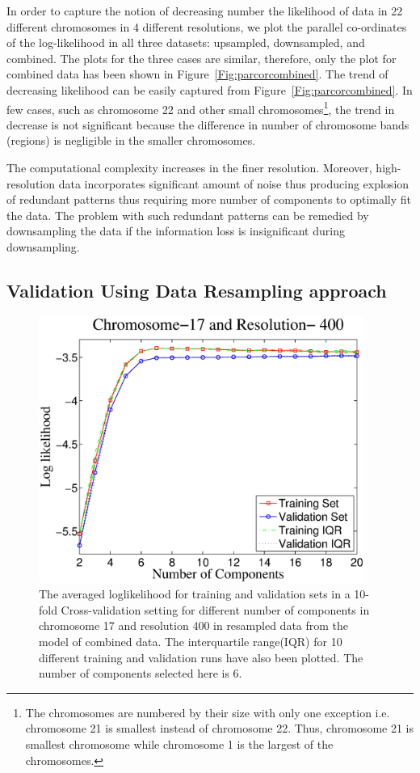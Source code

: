 In order to capture the notion of decreasing number the likelihood of data in 22 different chromosomes in 4 different resolutions, we plot the parallel co-ordinates of the log-likelihood in all three datasets: upsampled, downsampled, and combined. The plots for the three cases are similar, therefore, only the plot for combined data has been shown in Figure~\ref{Fig:parcorcombined}. The trend of decreasing likelihood can be easily captured from Figure~\ref{Fig:parcorcombined}. In few cases, such as chromosome 22 and other small chromosomes\footnote{The chromosomes are numbered by their size with only one exception i.e. chromosome 21 is smallest instead of chromosome 22. Thus, chromosome 21 is smallest chromosome while chromosome 1 is the largest of the chromosomes.}, the trend in decrease is not significant because the difference in number of chromosome bands (regions) is negligible in the smaller chromosomes. 


The computational complexity increases in the finer resolution. Moreover, high-resolution data incorporates significant amount of noise thus producing explosion of redundant patterns thus requiring more number of components to optimally fit the data. The problem with such redundant patterns can be remedied by downsampling the data if the information loss is insignificant during downsampling.


\subsection{Validation Using Data Resampling approach}
\label{ss:resampling}

\begin{figure}[h!]
\centering
\includegraphics[width=0.95\textwidth]{figures/chr17dm400resample}
\caption[Model selection in resampled data]{The averaged loglikelihood for training and validation sets in a 10-fold Cross-validation setting for different number of components in chromosome 17 and resolution 400 in resampled data from the model of combined data. The interquartile range(IQR) for 10 different training and validation runs have also been plotted. The number of components selected here is 6. }\label{Fig:sampmdlsel}
\end{figure}

